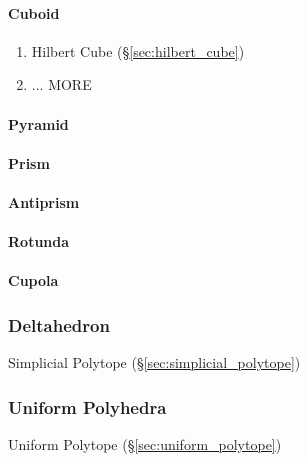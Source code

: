 \paragraph{Cuboid}\label{sec:cuboid}\hfill

\begin{enumerate}
  \item Hilbert Cube (\S\ref{sec:hilbert_cube})
  \item ... MORE
\end{enumerate}



\paragraph{Pyramid}\label{sec:pyramid}\hfill

\paragraph{Prism}\label{sec:prism}\hfill

\paragraph{Antiprism}\label{sec:antiprism}\hfill

\paragraph{Rotunda}\label{sec:rotunda}\hfill

\paragraph{Cupola}\label{sec:cupola}\hfill



\subsubsection{Deltahedron}\label{sec:deltahedron}

Simplicial Polytope (\S\ref{sec:simplicial_polytope})



\subsubsection{Uniform Polyhedra}\label{sec:uniform_polyhedra}

\fist Uniform Polytope (\S\ref{sec:uniform_polytope})



